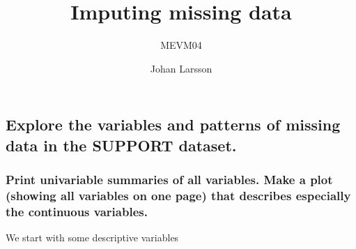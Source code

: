 \documentclass[headinclude=false]{scrartcl}\usepackage[]{graphicx}\usepackage[]{color}
\title{Imputing missing data}
\subtitle{MEVM04}
\author{Johan Larsson}
\begin{document}
\maketitle



\subsection{Explore the variables and patterns of missing data in the SUPPORT
dataset.}
\subsubsection{Print univariable summaries of all variables. Make a plot (showing all
variables on one page) that describes especially the continuous variables.}

We start with some descriptive variables
\end{document}
